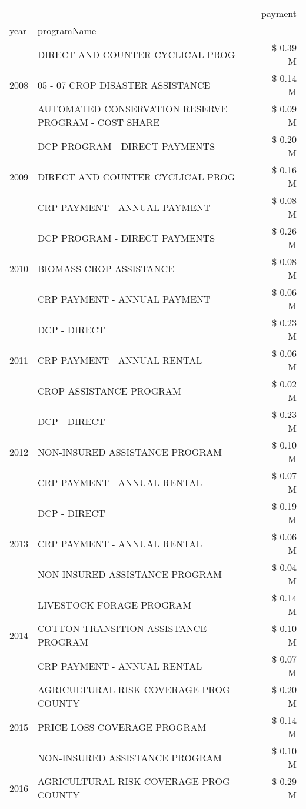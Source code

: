\begin{tabular}{llr}
\toprule
 &  & payment \\
year & programName &  \\
\midrule
\multirow[t]{3}{*}{2008} & DIRECT AND COUNTER CYCLICAL PROG & \$ 0.39 M \\
 & 05 - 07 CROP DISASTER ASSISTANCE & \$ 0.14 M \\
 & AUTOMATED CONSERVATION RESERVE PROGRAM - COST SHARE & \$ 0.09 M \\
\cline{1-3}
\multirow[t]{3}{*}{2009} & DCP PROGRAM - DIRECT PAYMENTS & \$ 0.20 M \\
 & DIRECT AND COUNTER CYCLICAL PROG & \$ 0.16 M \\
 & CRP PAYMENT - ANNUAL PAYMENT & \$ 0.08 M \\
\cline{1-3}
\multirow[t]{3}{*}{2010} & DCP PROGRAM - DIRECT PAYMENTS & \$ 0.26 M \\
 & BIOMASS CROP ASSISTANCE & \$ 0.08 M \\
 & CRP PAYMENT - ANNUAL PAYMENT & \$ 0.06 M \\
\cline{1-3}
\multirow[t]{3}{*}{2011} & DCP - DIRECT & \$ 0.23 M \\
 & CRP PAYMENT - ANNUAL RENTAL & \$ 0.06 M \\
 & CROP ASSISTANCE PROGRAM & \$ 0.02 M \\
\cline{1-3}
\multirow[t]{3}{*}{2012} & DCP - DIRECT & \$ 0.23 M \\
 & NON-INSURED ASSISTANCE PROGRAM & \$ 0.10 M \\
 & CRP PAYMENT - ANNUAL RENTAL & \$ 0.07 M \\
\cline{1-3}
\multirow[t]{3}{*}{2013} & DCP - DIRECT & \$ 0.19 M \\
 & CRP PAYMENT - ANNUAL RENTAL & \$ 0.06 M \\
 & NON-INSURED ASSISTANCE PROGRAM & \$ 0.04 M \\
\cline{1-3}
\multirow[t]{3}{*}{2014} & LIVESTOCK FORAGE PROGRAM & \$ 0.14 M \\
 & COTTON TRANSITION ASSISTANCE PROGRAM & \$ 0.10 M \\
 & CRP PAYMENT - ANNUAL RENTAL & \$ 0.07 M \\
\cline{1-3}
\multirow[t]{3}{*}{2015} & AGRICULTURAL RISK COVERAGE PROG - COUNTY & \$ 0.20 M \\
 & PRICE LOSS COVERAGE PROGRAM & \$ 0.14 M \\
 & NON-INSURED ASSISTANCE PROGRAM & \$ 0.10 M \\
\cline{1-3}
\multirow[t]{3}{*}{2016} & AGRICULTURAL RISK COVERAGE PROG - COUNTY      & \$ 0.29 M \\

\end{tabular}
